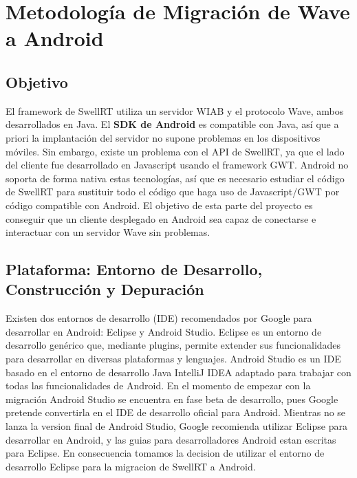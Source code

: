 \section{Metodología de Migración de Wave a Android}

  \subsection{Objetivo}
  
    El framework de SwellRT utiliza un servidor WIAB y el protocolo Wave, ambos desarrollados en Java. El \textbf{SDK de Android} \cite{ref:android_sdk} es compatible con Java, así que a priori la implantación del servidor no supone problemas en los dispositivos móviles. Sin embargo, existe un problema con el API de SwellRT, ya que el lado del cliente fue desarrollado en Javascript usando el framework GWT. Android no soporta de forma nativa estas tecnologías, así que es necesario estudiar el código de SwellRT para sustituir todo el código que haga uso de Javascript/GWT por código compatible con Android. El objetivo de esta parte del proyecto es conseguir que un cliente desplegado en Android sea capaz de conectarse e interactuar con un servidor Wave sin problemas.  
  
  \subsection{Plataforma: Entorno de Desarrollo, Construcción y Depuración}
  
    Existen dos entornos de desarrollo (IDE) recomendados por Google para desarrollar en Android: Eclipse \cite{ref:eclipse} y Android Studio.\cite{ref:android_studio} Eclipse es un entorno de desarrollo genérico que, mediante plugins, permite extender sus funcionalidades para desarrollar en diversas plataformas y lenguajes. Android Studio es un IDE basado en el entorno de desarrollo Java IntelliJ IDEA \cite{ref:intelliJ_Idea} adaptado para trabajar con todas las funcionalidades de Android. En el momento de empezar con la migración Android Studio se encuentra en fase beta de desarrollo, pues Google pretende convertirla en el IDE de desarrollo oficial para Android. Mientras no se lanza la version final de Android Studio, Google recomienda utilizar Eclipse para desarrollar en Android, y las guias para desarrolladores Android estan escritas para Eclipse. En consecuencia tomamos la decision de utilizar el entorno de desarrollo Eclipse para la migracion de SwellRT a Android. 

